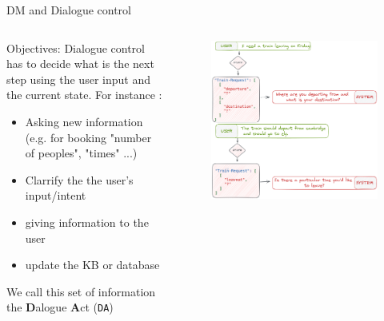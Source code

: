 \documentclass[10pt,aspectratio=169]{beamer}
\begin{document}
\begin{frame}{DM and Dialogue control}
    \begin{columns}
        \begin{column}{0.5\textwidth}
            \begin{block}{Objectives:}
                Dialogue control has to decide what is the next step using the user input and the current state. For instance :
                \begin{itemize}
                    \item Asking new information (e.g. for booking "number of peoples", "times" ...)
                    \item Clarrify the the user's input/intent
                    \item giving information to the user
                    \item update the KB or database 
                \end{itemize}
            \end{block}
            We call this set of information the \textbf{D}alogue \textbf{A}ct (\texttt{DA})
        \end{column}
        \begin{column}{0.5\textwidth}
            \begin{figure}
                \centering
                \includegraphics[width=1.\textwidth]{media/act.png}
            \end{figure}
        \end{column}
    \end{columns}
\end{frame}
\end{document}
